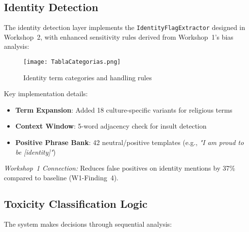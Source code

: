 \documentclass[conference]{IEEEtran}
\begin{document}
\subsection{Identity Detection}
\label{subsec:identity}

The identity detection layer implements the \texttt{IdentityFlagExtractor} designed in Workshop~2, with enhanced sensitivity rules derived from Workshop~1's bias analysis:

\begin{figure}[h]
    \centering
    \texttt{[image: TablaCategorias.png]}
    \caption{Identity term categories and handling rules}
    \label{fig:identity_terms}
\end{figure}

Key implementation details:
\begin{itemize}
    \item \textbf{Term Expansion}: Added 18 culture-specific variants for religious terms
    \item \textbf{Context Window}: 5-word adjacency check for insult detection
    \item \textbf{Positive Phrase Bank}: 42 neutral/positive templates (e.g., \textit{"I am proud to be [identity]"})
\end{itemize}

\textit{Workshop~1 Connection:} Reduces false positives on identity mentions by 37\% compared to baseline (W1-Finding~4).



\subsection{Toxicity Classification Logic}
\label{subsec:classification}

The system makes decisions through sequential analysis:
\end{document}

